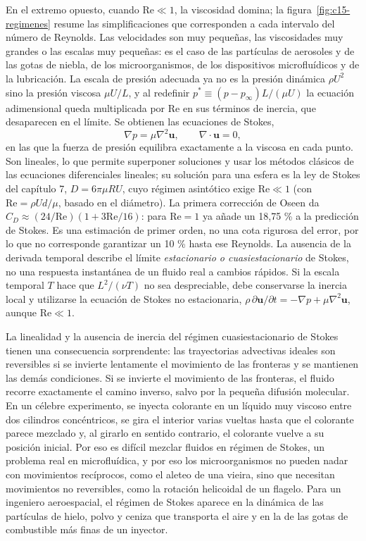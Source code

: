 \documentclass[10pt,openany]{book}
\begin{document}
En el extremo opuesto, cuando \(\mathrm{Re} \ll 1\), la viscosidad domina; la figura~\ref{fig:c15-regimenes} resume las simplificaciones que corresponden a cada intervalo del número de Reynolds. Las velocidades son muy pequeñas, las viscosidades muy grandes o las escalas muy pequeñas: es el caso de las partículas de aerosoles y de las gotas de niebla, de los microorganismos, de los dispositivos microfluídicos y de la lubricación. La escala de presión adecuada ya no es la presión dinámica \(\rho U^{2}\) sino la presión viscosa \(\mu U/L\), y al redefinir \(p^{*} \equiv (p - p_\infty)L/(\mu U)\) la ecuación adimensional queda multiplicada por \(\mathrm{Re}\) en sus términos de inercia, que desaparecen en el límite. Se obtienen las ecuaciones de Stokes,
\begin{equation}
\nabla p = \mu\nabla^{2}\mathbf{u}, \qquad \nabla\cdot\mathbf{u} = 0, \label{eq:c15-stokes}
\end{equation}
en las que la fuerza de presión equilibra exactamente a la viscosa en cada punto. Son lineales, lo que permite superponer soluciones y usar los métodos clásicos de las ecuaciones diferenciales lineales; su solución para una esfera es la ley de Stokes del capítulo 7, \(D = 6\pi\mu R U\), cuyo régimen asintótico exige \(\mathrm{Re}\ll1\) (con \(\mathrm{Re}=\rho U d/\mu\), basado en el diámetro). La primera corrección de Oseen da \(C_D\approx(24/\mathrm{Re})(1+3\mathrm{Re}/16)\): para \(\mathrm{Re}=1\) ya añade un 18,75 \% a la predicción de Stokes. Es una estimación de primer orden, no una cota rigurosa del error, por lo que no corresponde garantizar un 10 \% hasta ese Reynolds. La ausencia de la derivada temporal describe el límite \emph{estacionario o cuasiestacionario} de Stokes, no una respuesta instantánea de un fluido real a cambios rápidos. Si la escala temporal \(T\) hace que \(L^{2}/(\nu T)\) no sea despreciable, debe conservarse la inercia local y utilizarse la ecuación de Stokes no estacionaria, \(\rho\,\partial\mathbf{u}/\partial t=-\nabla p+\mu\nabla^{2}\mathbf{u}\), aunque \(\mathrm{Re}\ll1\).

La linealidad y la ausencia de inercia del régimen cuasiestacionario de Stokes tienen una consecuencia sorprendente: las trayectorias advectivas ideales son reversibles si se invierte lentamente el movimiento de las fronteras y se mantienen las demás condiciones. Si se invierte el movimiento de las fronteras, el fluido recorre exactamente el camino inverso, salvo por la pequeña difusión molecular. En un célebre experimento, se inyecta colorante en un líquido muy viscoso entre dos cilindros concéntricos, se gira el interior varias vueltas hasta que el colorante parece mezclado y, al girarlo en sentido contrario, el colorante vuelve a su posición inicial. Por eso es difícil mezclar fluidos en régimen de Stokes, un problema real en microfluídica, y por eso los microorganismos no pueden nadar con movimientos recíprocos, como el aleteo de una vieira, sino que necesitan movimientos no reversibles, como la rotación helicoidal de un flagelo. Para un ingeniero aeroespacial, el régimen de Stokes aparece en la dinámica de las partículas de hielo, polvo y ceniza que transporta el aire y en la de las gotas de combustible más finas de un inyector.
\end{document}
